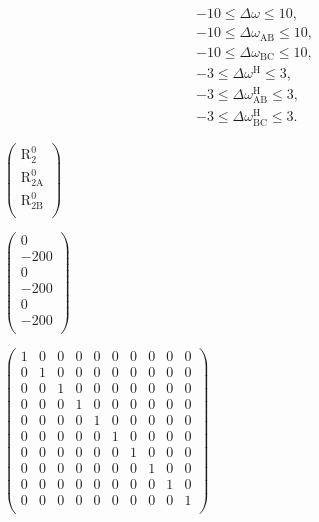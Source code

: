 \documentclass[a4paper,11pt,twoside,openright]{book}
\def\lthtmlcheckvsize{\ifdim\ht\sizebox<\vsize 
  \ifdim\wd\sizebox<\hsize\expandafter\hfill\fi \expandafter\vfill
  \else\expandafter\vss\fi}%
\begin{document}
{\newpage\clearpage
\setcounter{equation}{91}
%
\begin{subequations}\begin{gather}
-10 \leqslant \Delta\omega \leqslant 10, \\
-10 \leqslant \Delta\omega_{\textrm{AB}}\leqslant 10, \\
-10 \leqslant \Delta\omega_{\textrm{BC}}\leqslant 10, \\
-3 \leqslant \Delta\omega^{\scriptscriptstyle\mathrm{H}}\leqslant 3, \\
-3 \leqslant \Delta\omega^{\scriptscriptstyle\mathrm{H}}_{\textrm{AB}}\leqslant 3, \\
-3 \leqslant \Delta\omega^{\scriptscriptstyle\mathrm{H}}_{\textrm{BC}}\leqslant 3.
\end{gather}\end{subequations}%
\lthtmldisplayZ
\lthtmlcheckvsize\clearpage}

{\newpage\clearpage
{}%
$\displaystyle \begin{pmatrix}
\mathrm{R}_2^0\\
\mathrm{R}_{\mathrm{2A}}^0\\
\mathrm{R}_{\mathrm{2B}}^0\\
\end{pmatrix}$%
\lthtmlindisplaymathZ
\lthtmlcheckvsize\clearpage}

{\newpage\clearpage
{}%
$\displaystyle \begin{pmatrix}
0 \\
-200 \\
0 \\
-200 \\
0 \\
-200 \\
\end{pmatrix}$%
\lthtmlindisplaymathZ
\lthtmlcheckvsize\clearpage}

{\newpage\clearpage
{}%
$\displaystyle \begin{pmatrix}
1 & 0 & 0 & 0 & 0 & 0 & 0 & 0 & 0 & 0 \\
0 & 1 & 0 & 0 & 0 & 0 & 0 & 0 & 0 & 0 \\
0 & 0 & 1 & 0 & 0 & 0 & 0 & 0 & 0 & 0 \\
0 & 0 & 0 & 1 & 0 & 0 & 0 & 0 & 0 & 0 \\
0 & 0 & 0 & 0 & 1 & 0 & 0 & 0 & 0 & 0 \\
0 & 0 & 0 & 0 & 0 & 1 & 0 & 0 & 0 & 0 \\
0 & 0 & 0 & 0 & 0 & 0 & 1 & 0 & 0 & 0 \\
0 & 0 & 0 & 0 & 0 & 0 & 0 & 1 & 0 & 0 \\
0 & 0 & 0 & 0 & 0 & 0 & 0 & 0 & 1 & 0 \\
0 & 0 & 0 & 0 & 0 & 0 & 0 & 0 & 0 & 1 \\
\end{pmatrix}$%
\lthtmlindisplaymathZ
\lthtmlcheckvsize\clearpage}
\end{document}
